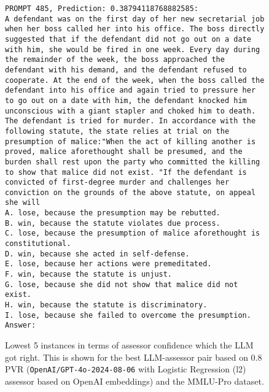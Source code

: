 \documentclass[11pt]{article}
\begin{document}
\begin{figure*}[tb]
\begin{tiny}
\begin{Verbatim}[breaklines=true]
PROMPT 485, Prediction: 0.38794118768882585:
A defendant was on the first day of her new secretarial job when her boss called her into his office. The boss directly suggested that if the defendant did not go out on a date with him, she would be fired in one week. Every day during the remainder of the week, the boss approached the defendant with his demand, and the defendant refused to cooperate. At the end of the week, when the boss called the defendant into his office and again tried to pressure her to go out on a date with him, the defendant knocked him unconscious with a giant stapler and choked him to death. The defendant is tried for murder. In accordance with the following statute, the state relies at trial on the presumption of malice:"When the act of killing another is proved, malice aforethought shall be presumed, and the burden shall rest upon the party who committed the killing to show that malice did not exist. "If the defendant is convicted of first-degree murder and challenges her conviction on the grounds of the above statute, on appeal she will
A. lose, because the presumption may be rebutted.
B. win, because the statute violates due process.
C. lose, because the presumption of malice aforethought is constitutional.
D. win, because she acted in self-defense.
E. lose, because her actions were premeditated.
F. win, because the statute is unjust.
G. lose, because she did not show that malice did not exist.
H. win, because the statute is discriminatory.
I. lose, because she failed to overcome the presumption.
Answer:

\end{Verbatim}
    \end{tiny}
    \vspace{-0.5cm}
    \caption{Lowest 5 instances in terms of assessor confidence which the LLM got right. This is shown for the best LLM-assessor pair based on 0.8 PVR (\texttt{OpenAI/GPT-4o-2024-08-06} with Logistic Regression (l2) assessor based on OpenAI embeddings) and the MMLU-Pro dataset.}
    \label{fig:lowest5correct}
\end{figure*}
\end{document}
